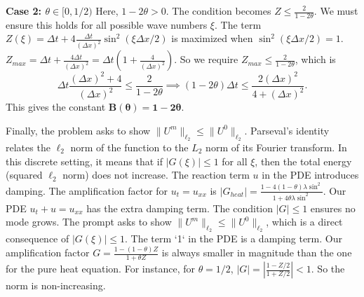 \begin{solution}
\begin{enumerate}
    \textbf{Case 2: $\theta \in [0, 1/2)$}
    Here, $1-2\theta > 0$. The condition becomes $Z \leq \frac{2}{1-2\theta}$.
    We must ensure this holds for all possible wave numbers $\xi$. The term $Z(\xi) = \Delta t + 4\frac{\Delta t}{(\Delta x)^2}\sin^2(\xi\Delta x/2)$ is maximized when $\sin^2(\xi\Delta x/2)=1$.
    $Z_{max} = \Delta t + \frac{4\Delta t}{(\Delta x)^2} = \Delta t \left(1 + \frac{4}{(\Delta x)^2}\right)$.
    So we require $Z_{max} \leq \frac{2}{1-2\theta}$, which is
    \[ \Delta t \frac{(\Delta x)^2 + 4}{(\Delta x)^2} \leq \frac{2}{1-2\theta} \implies (1-2\theta)\Delta t \leq \frac{2(\Delta x)^2}{4 + (\Delta x)^2}. \]
    This gives the constant $\mathbf{B(\theta) = 1-2\theta}$.
\end{enumerate}
Finally, the problem asks to show $\|U^m\|_{\ell_2} \leq \|U^0\|_{\ell_2}$. Parseval's identity relates the $\ell_2$ norm of the function to the $L_2$ norm of its Fourier transform. In this discrete setting, it means that if $|G(\xi)| \leq 1$ for all $\xi$, then the total energy (squared $\ell_2$ norm) does not increase. The reaction term $u$ in the PDE introduces damping. The amplification factor for $u_t = u_{xx}$ is $|G_{heat}| = \frac{1-4(1-\theta)\lambda\sin^2}{1+4\theta\lambda\sin^2}$. Our PDE $u_t+u=u_{xx}$ has the extra damping term. The condition $|G| \le 1$ ensures no mode grows. The prompt asks to show $\| U ^ { m } \| _ { \ell _ { 2 } } \leq \| U ^ { 0 } \| _ { \ell _ { 2 } }$, which is a direct consequence of $|G(\xi)|\le 1$.
The term `1` in the PDE is a damping term. Our amplification factor $G = \frac{1-(1-\theta)Z}{1+\theta Z}$ is always smaller in magnitude than the one for the pure heat equation. For instance, for $\theta=1/2$, $|G| = |\frac{1-Z/2}{1+Z/2}|<1$. So the norm is non-increasing.
\end{solution}

